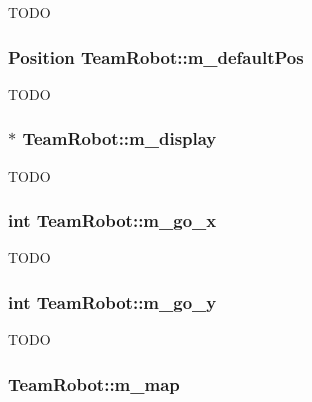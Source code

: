 \label{classTeamRobot_a3bfcb3cdeedcc11eaed1b5bce532560f}
TODO \hypertarget{classTeamRobot_a5758854ca2d6a084bea074c39e75b5d3}{
\subsubsection[{m\_\-defaultPos}]{\setlength{\rightskip}{0pt plus 5cm}Position {\bf TeamRobot::m\_\-defaultPos}}}
\label{classTeamRobot_a5758854ca2d6a084bea074c39e75b5d3}
TODO \hypertarget{classTeamRobot_aecbb2869966fba9b3de3cbc530c7bc36}{
\subsubsection[{m\_\-display}]{$\ast$ {\bf TeamRobot::m\_\-display}}}
\label{classTeamRobot_aecbb2869966fba9b3de3cbc530c7bc36}
TODO \hypertarget{classTeamRobot_ae4bafa3b5f0df155b1a45f95f6671316}{
\subsubsection[{m\_\-go\_\-x}]{\setlength{\rightskip}{0pt plus 5cm}int {\bf TeamRobot::m\_\-go\_\-x}}}
\label{classTeamRobot_ae4bafa3b5f0df155b1a45f95f6671316}
TODO \hypertarget{classTeamRobot_ad0b6cee88278087238bf6fcecb419808}{
\subsubsection[{m\_\-go\_\-y}]{\setlength{\rightskip}{0pt plus 5cm}int {\bf TeamRobot::m\_\-go\_\-y}}}
\label{classTeamRobot_ad0b6cee88278087238bf6fcecb419808}
TODO \hypertarget{classTeamRobot_acf38fcc5b3c4ab4815fb151e39d5889c}{
\subsubsection[{m\_\-map}]{ {\bf TeamRobot::m\_\-map}}}
